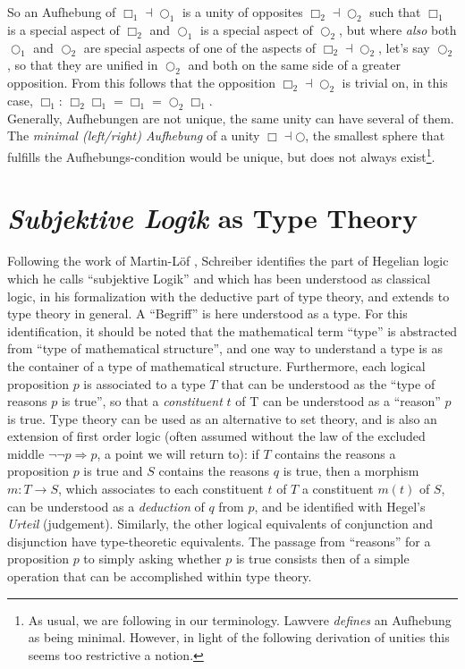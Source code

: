 \documentclass{article}
\begin{document}
So an Aufhebung of $\Box_1\dashv\bigcirc_1$ is a unity of opposites $\Box_2\dashv\bigcirc_2$ such that $\Box_1$ is a special aspect of $\Box_2$ and $\bigcirc_1$ is a special aspect of $\bigcirc_2$, but where \emph{also} both $\bigcirc_1$ and $\bigcirc_2$ are special aspects of one of the aspects of $\Box_2\dashv\bigcirc_2$, let's say $\bigcirc_2$, so that they are unified in $\bigcirc_2$ and both on the same side of a greater opposition. From this follows that the opposition $\Box_2\dashv\bigcirc_2$ is trivial on, in this case, $\Box_1$: $\Box_2\Box_1=\Box_1=\bigcirc_2\Box_1$. \\

Generally, Aufhebungen are not unique, the same unity can have several of them. The \emph{minimal (left/right) Aufhebung} of a unity $\Box\dashv\bigcirc$, the smallest sphere that fulfills the Aufhebungs-condition would be unique, but does not always exist\footnote{As usual, we are following \cite{nlabsol} in our terminology. Lawvere \emph{defines} an Aufhebung as being minimal\cite{Lawvere92}. However, in light of the following derivation of unities this seems too restrictive a notion.}.


\section{\emph{Subjektive Logik} as Type Theory}
Following the work of Martin-Löf \cite{Loef96}, Schreiber identifies the part of Hegelian logic which he calls ``subjektive Logik'' and which has been understood as classical logic, in his formalization with the deductive part of type theory, and extends to type theory in general. A ``Begriff'' is here understood as a type. For this identification, it should be noted that the mathematical term ``type'' is abstracted from ``type of mathematical structure'', and one way to understand a type is as the container of a type of mathematical structure. Furthermore, each logical proposition $p$ is associated to a type $T$ that can be understood as the ``type of reasons $p$ is true'', so that a \emph{constituent} $t$ of T can be understood as a ``reason'' $p$ is true. Type theory can be used as an alternative to set theory, and is also an extension of first order logic (often assumed without the law of the excluded middle $\neg\neg p \Rightarrow p$, a point we will return to): if $T$ contains the reasons a proposition $p$ is true and $S$ contains the reasons $q$ is true, then a morphism $m:T\rightarrow S$, which associates to each constituent $t$ of $T$ a constituent $m(t)$ of $S$, can be understood as a \emph{deduction} of $q$ from $p$, and be identified with Hegel's \emph{Urteil} (judgement). Similarly, the other logical equivalents of conjunction and disjunction have type-theoretic equivalents. The passage from ``reasons'' for a proposition $p$ to simply asking whether $p$ is true consists then of a simple operation that can be accomplished within type theory. \\
\end{document}
